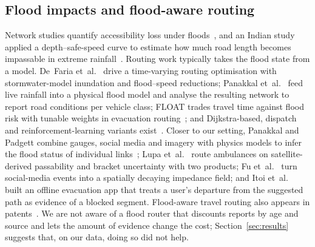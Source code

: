 \documentclass[conference]{IEEEtran}
\begin{document}
\subsection{Flood impacts and flood-aware routing}
Network studies quantify accessibility loss under floods~\cite{yin2016shanghai,coles2017york,green2017emergency,kasmalkar2020floods,zhou2022connectivity,loreti2022local}, and an Indian study applied a depth--safe-speed curve to estimate how much road length becomes impassable in extreme rainfall~\cite{singh2018vulnerability}. Routing work typically takes the flood state from a model. De~Faria et~al.~\cite{defaria2026routing} drive a time-varying routing optimisation with stormwater-model inundation and flood--speed reductions; Panakkal et~al.~\cite{panakkal2023safer} feed live rainfall into a physical flood model and analyse the resulting network to report road conditions per vehicle class; FLOAT trades travel time against flood risk with tunable weights in evacuation routing~\cite{jao2025float}; and Dijkstra-based, dispatch and reinforcement-learning variants exist~\cite{li2023dijkstra,liang2025rescue,li2025drl,bucar2022route}. Closer to our setting, Panakkal and Padgett combine gauges, social media and imagery with physics models to infer the flood status of individual links~\cite{panakkal2024eyes}; Lupa et~al.~\cite{lupa2026stars} route ambulances on satellite-derived passability and bracket uncertainty with two products; Fu et~al.~\cite{fu2026social} turn social-media events into a spatially decaying impedance field; and Itoi et~al.~\cite{itoi2017offline} built an offline evacuation app that treats a user's departure from the suggested path as evidence of a blocked segment. Flood-aware travel routing also appears in patents~\cite{ibm2013patent,uber2020patent}. We are not aware of a flood router that discounts reports by age and source and lets the amount of evidence change the cost; Section~\ref{sec:results} suggests that, on our data, doing so did not help.
\end{document}
